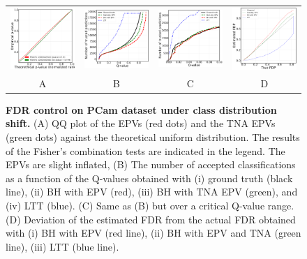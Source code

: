 \documentclass{article}
\begin{document}
\begin{figure}
	\advance\leftskip-0.5cm
	\begin{tabular}{cccc}
 		\includegraphics[width=1.7in]{img/cnn_QQ_pcam_balanced.png} &
		\includegraphics[width=1.7in]{img/cnn_pcam_balanced_fdr_control.png} & 
        \includegraphics[width=1.7in]{img/cnn_pcam_balanced_fdr_control_loc.png} &
        \includegraphics[width=1.7in]{img/cnn_FDPscat_pcam_balanced.png}
		\\	
		A & B & C & D
	\end{tabular}
	\caption{{\bf FDR control on PCam dataset under class distribution shift.} (A) QQ plot of the EPVs (red dots) and the TNA EPVs (green dots) against the theoretical uniform distribution. The results of the Fisher's combination tests are indicated in the legend. The EPVs are slight inflated,  (B) The number of accepted classifications as a function of the Q-values obtained with (i) ground truth (black line), (ii) BH with EPV (red), (iii) BH with TNA EPV (green), and (iv) LTT (blue). (C) Same as (B) but over a critical Q-value range. (D) Deviation of the estimated FDR from the actual FDR obtained with (i) BH with EPV (red line), (ii) BH with EPV and TNA (green line), (iii) LTT (blue line).}
	\label{fig:pcam_rebalance}
\end{figure} 
\end{document}
